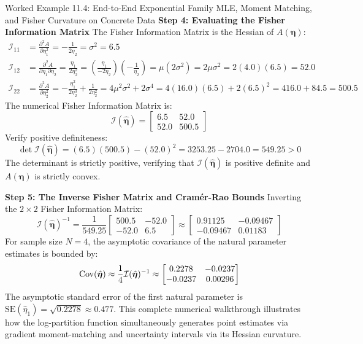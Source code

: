 \begin{examplebox}[breakable]{Worked Example 11.4: End-to-End Exponential Family MLE, Moment Matching, and Fisher Curvature on Concrete Data}
\textbf{Step 4: Evaluating the Fisher Information Matrix}
The Fisher Information Matrix is the Hessian of $A(\boldsymbol{\eta})$:
\begin{align}
\mathcal{I}_{11} &= \frac{\partial^2 A}{\partial \eta_1^2} = -\frac{1}{2\eta_2} = \sigma^2 = 6.5 \\
\mathcal{I}_{12} &= \frac{\partial^2 A}{\partial \eta_1 \partial \eta_2} = \frac{\eta_1}{2\eta_2^2} = \left(\frac{\eta_1}{-2\eta_2}\right)\left(-\frac{1}{\eta_2}\right) = \mu (2\sigma^2) = 2\mu\sigma^2 = 2(4.0)(6.5) = 52.0 \\
\mathcal{I}_{22} &= \frac{\partial^2 A}{\partial \eta_2^2} = -\frac{\eta_1^2}{2\eta_2^3} + \frac{1}{2\eta_2^2} = 4\mu^2\sigma^2 + 2\sigma^4 = 4(16.0)(6.5) + 2(6.5)^2 = 416.0 + 84.5 = 500.5
\end{align}
The numerical Fisher Information Matrix is:
\begin{equation}
\mathcal{I}(\hat{\boldsymbol{\eta}}) = \begin{bmatrix} 6.5 & 52.0 \\ 52.0 & 500.5 \end{bmatrix}
\end{equation}
Verify positive definiteness:
\begin{equation}
\det \mathcal{I}(\hat{\boldsymbol{\eta}}) = (6.5)(500.5) - (52.0)^2 = 3253.25 - 2704.0 = 549.25 > 0
\end{equation}
The determinant is strictly positive, verifying that $\mathcal{I}(\hat{\boldsymbol{\eta}})$ is positive definite and $A(\boldsymbol{\eta})$ is strictly convex.

\textbf{Step 5: The Inverse Fisher Matrix and Cramér-Rao Bounds}
Inverting the $2 \times 2$ Fisher Information Matrix:
\begin{equation}
\mathcal{I}(\hat{\boldsymbol{\eta}})^{-1} = \frac{1}{549.25} \begin{bmatrix} 500.5 & -52.0 \\ -52.0 & 6.5 \end{bmatrix} \approx \begin{bmatrix} 0.91125 & -0.09467 \\ -0.09467 & 0.01183 \end{bmatrix}
\end{equation}
For sample size $N = 4$, the asymptotic covariance of the natural parameter estimates is bounded by:
\begin{equation}
\operatorname{Cov}(\hat{\boldsymbol{\eta}}) \approx \frac{1}{4} \mathcal{I}(\hat{\boldsymbol{\eta}})^{-1} \approx \begin{bmatrix} 0.2278 & -0.0237 \\ -0.0237 & 0.00296 \end{bmatrix}
\end{equation}
The asymptotic standard error of the first natural parameter is $\text{SE}(\hat{\eta}_1) = \sqrt{0.2278} \approx 0.477$. This complete numerical walkthrough illustrates how the log-partition function simultaneously generates point estimates via gradient moment-matching and uncertainty intervals via its Hessian curvature.
\end{examplebox}

